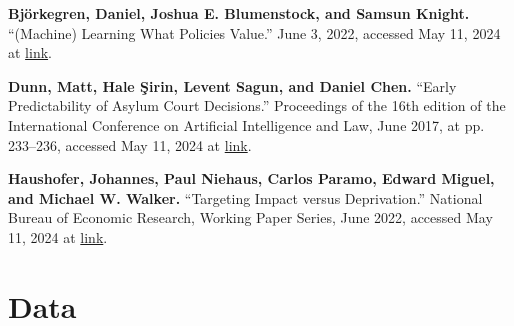 \documentclass{article}
\begin{document}
\begin{hangparas}{.25in}{1}

\textbf{Björkegren, Daniel, Joshua E. Blumenstock, and Samsun Knight.} 
“(Machine) Learning What Policies Value.” June 3, 2022, accessed May 11, 2024 at \href{https://arxiv.org/abs/2206.00727}{link}.

\textbf{Dunn, Matt, Hale Şirin, Levent Sagun, and Daniel Chen.} “Early Predictability of Asylum Court Decisions.” Proceedings of the 16th edition of the International Conference on Artificial Intelligence and Law, June 2017, at pp. 233–236, accessed May 11, 2024 at \href{https://tinyurl.com/mpjt4sb5}{link}.

\textbf{Haushofer, Johannes, Paul Niehaus, Carlos Paramo, Edward Miguel, and Michael W. Walker.} “Targeting Impact versus Deprivation.” National Bureau of Economic Research, Working Paper Series, June 2022, accessed May 11, 2024 at \href{https://www.nber.org/papers/w30138}{link}.

\end{hangparas}

\section{Data}
\end{document}
